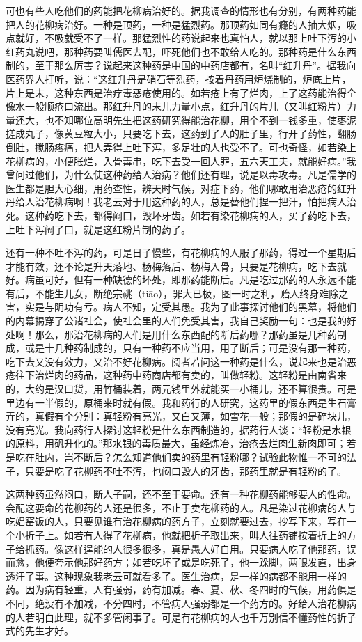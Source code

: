 \documentclass[12pt,UTF8]{ctexbook}
\begin{document}
可也有些人吃他们的药能把花柳病治好的。据我调查的情形也有分别，有两种药能把人的花柳病治好。一种是顶药，一种是猛烈药。那顶药如同有瘾的人抽大烟，吸点就好，不吸就受不了一样。那猛烈性的药说起来也真怕人，就以那上吐下泻的小红药丸说吧，那种药要叫儒医去配，吓死他们也不敢给人吃的。那种药是什么东西制的，至于那么厉害？说起来这种药是中国的中药店都有，名叫“红升丹”。据我向医药界人打听，说：“这红升丹是硝石等烈药，按着丹药用炉烧制的，炉底上片，片上是末，这种东西是治疗毒恶疮使用的。如若疮上有了烂肉，上了这药能治得全像水一般顺疮口流出。那红升丹的末儿力量小点，红升丹的片儿（又叫红粉片）力量还大，也不知哪位高明先生把这药研究得能治花柳，用个不到一钱多重，使枣泥搓成丸子，像黄豆粒大小，只要吃下去，这药到了人的肚子里，行开了药性，翻肠倒肚，搅肠疼痛，把人弄得上吐下泻，多足壮的人也受不了。可也奇怪，如若染上花柳病的，小便胀烂，入骨毒串，吃下去受一回人罪，五六天工夫，就能好病。”我曾问过他们，为什么使这种药给人治病？他们还有理，说是以毒攻毒。凡是儒学的医生都是胆大心细，用药查性，辨天时气候，对症下药，他们哪敢用治恶疮的红升丹给人治花柳病啊！我老云对于用这种药的人，总是替他们捏一把汗，怕把病人治死。这种药吃下去，都得闷口，毁坏牙齿。如若有染花柳病的人，买了药吃下去，上吐下泻闷了口，就是这红粉片制的药了。

还有一种不吐不泻的药，可是日子慢些，有花柳病的人服了那药，得过一个星期后才能有效，还不论是升天落地、杨梅落后、杨梅入骨，只要是花柳病，吃下去就好。病虽可好，但有一种缺德的坏处，即那药能断后。凡是吃过那药的人永远不能有后，不能生儿女，断绝宗祧（tiāo），罪大已极，图一时之利，贻人终身难除之害，实是与阴功有亏。病人不知，定受其愚。我为了此事探讨他们的黑幕，将他们的内幕揭穿了公诸社会，使社会里的人们免受其害，我自己奖励一句：也是我的好处啊！那么，那治花柳病的人们是用什么东西配的断后药哪？那药虽是几种药制成，或是十几种药制成的，只有一种药不应当用，用了断后；可是没有那一种药，吃下去又没有效力，又治不好花柳病。阅者若问这一种药是什么，说起来也是治恶疮往下治烂肉的药品，这种药中药商店都有卖的，叫做轻粉。这轻粉是由南省来的，大约是汉口货，用竹桶装着，两元钱里外就能买一小桶儿，还不算很贵。可是里边有一半假的，原桶来时就有假。我和药行的人研究，这药里的假东西是生石膏弄的，真假有个分别：真轻粉有亮光，又白又薄，如雪花一般；那假的是碎块儿，没有亮光。我向药行人探讨这轻粉是什么东西制造的，据药行人谈：“轻粉是水银的原料，用矾升化的。”那水银的毒质最大，虽经炼冶，治疮去烂肉生新肉即可；若是吃在肚内，岂不断后？怎么知道他们卖的药里有轻粉哪？试验此物惟一不可的法子，只要是吃了花柳药不吐不泻，也闷口毁人的牙齿，那药里就是有轻粉的了。

这两种药虽然闷口，断人子嗣，还不至于要命。还有一种花柳药能够要人的性命。会配这要命的花柳药的人还是很多，不止于卖花柳药的人。凡是染过花柳病的人与吃娼窑饭的人，只要见谁有治花柳病的药方子，立刻就要过去，抄写下来，写在一个小折子上。如若有人得了花柳病，他就把折子取出来，叫人往药铺按着折上的方子给抓药。像这样逞能的人很多很多，真是愚人好自用。只要病人吃了他那药，误而愈，他便夸示他那好药方；如若吃坏了或是吃死了，他一跺脚，两眼发直，出身透汗了事。这种现象我老云可就看多了。医生治病，是一样的病都不能用一样的药。因为病有轻重，人有强弱，药有加减。春、夏、秋、冬四时的气候，用药俱是不同，绝没有不加减，不分四时，不管病人强弱都是一个药方的。好给人治花柳病的人若明白此理，就不多管闲事了。可是有花柳病的人也千万别信不懂药性的折子式的先生才好。
\end{document}
